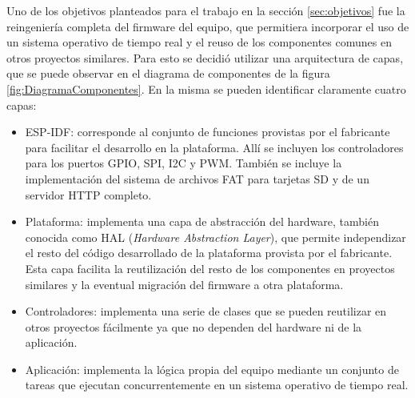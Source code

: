 Uno de los objetivos planteados para el trabajo en la sección \ref{sec:objetivos} fue la reingeniería completa del firmware del equipo, que permitiera incorporar el uso de un sistema operativo de tiempo real y el reuso de los componentes comunes en otros proyectos similares. Para esto se decidió utilizar una arquitectura de capas, que se puede observar en el diagrama de componentes de la figura \ref{fig:DiagramaComponentes}. En la misma se pueden identificar claramente cuatro capas:

\begin{itemize}
	\item ESP-IDF: corresponde al conjunto de funciones provistas por el fabricante para facilitar el desarrollo en la plataforma. Allí se incluyen los controladores para los puertos GPIO, SPI, I2C y PWM. También se incluye la implementación del sistema de archivos FAT para tarjetas SD y de un servidor HTTP completo.

	\item Plataforma: implementa una capa de abstracción del hardware, también conocida como HAL (\emph{Hardware Abstraction Layer})\cite{noauthor_hardware_2020}, que permite independizar el resto del código desarrollado de la plataforma provista por el fabricante. Esta capa facilita la reutilización del resto de los componentes en proyectos similares y la eventual migración del firmware a otra plataforma.

	\item Controladores: implementa una serie de clases que se pueden reutilizar en otros proyectos fácilmente ya que no dependen del hardware ni de la aplicación.

	\item Aplicación: implementa la lógica propia del equipo mediante un conjunto de tareas que ejecutan concurrentemente en un sistema operativo de tiempo real.
\end{itemize}


